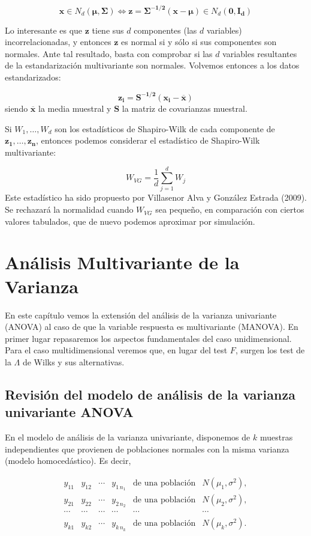 \documentclass[
  a4paper,
  oneside]{scrbook}
\theoremstyle{definition}
\theoremstyle{definition}
\theoremstyle{definition}
\theoremstyle{definition}
\theoremstyle{remark}
\begin{document}
\[\bm{x}\in N_d(\bm{\mu},\bm{\Sigma}) \Longleftrightarrow \bm{z}=\bm{\Sigma^{-1/2}}(\bm{x}-\bm{\mu})\in N_d(\bm{0},\bm{I_d})\]

Lo interesante es que \(\bm{z}\) tiene sus \(d\) componentes (las \(d\)
variables) incorrelacionadas, y entonces \(\bm{z}\) es normal si y sólo si
sus componentes son normales. Ante tal resultado, basta con comprobar si
las \(d\) variables resultantes de la estandarización multivariante son
normales. Volvemos entonces a los datos estandarizados:

\[\bm{z_i}=\bm{S^{-1/2}}\left(\bm{x_i}-\overline{\bm{x}}\right)\] siendo
\(\overline{\bm{x}}\) la media muestral y \(\bm{S}\) la matriz de covarianzas
muestral.

Si \(W_1,\ldots,W_d\) son los estadísticos de Shapiro-Wilk de cada
componente de \(\bm{z_1},\ldots,\bm{z_n}\), entonces podemos considerar el
estadístico de Shapiro-Wilk multivariante:

\[W_{VG}=\frac{1}{d}\sum_{j=1}^d W_j\] Este estadístico ha sido
propuesto por Villasenor Alva y González Estrada (2009). Se rechazará la
normalidad cuando \(W_{VG}\) sea pequeño, en comparación con ciertos
valores tabulados, que de nuevo podemos aproximar por simulación.

\chapter{Análisis Multivariante de la Varianza}\label{analisis-multivariante-de-la-varianza}

En este capítulo vemos la extensión del análisis de la varianza univariante
(ANOVA) al caso de que la variable respuesta es multivariante (MANOVA).
En primer lugar repasaremos los aspectos fundamentales del caso
unidimensional. Para el caso multidimensional veremos que, en lugar del
test \(F\), surgen los test de la \(\Lambda\) de Wilks y sus alternativas.

\section{Revisión del modelo de análisis de la varianza univariante ANOVA}\label{revision-del-modelo-de-analisis-de-la-varianza-univariante-anova}

En el modelo de análisis de la varianza univariante, disponemos de \(k\)
muestras independientes que provienen de poblaciones normales con la
misma varianza (modelo homocedástico). Es decir,

\[\begin{array}{cccccc}
y_{11} & y_{12} & \cdots & y_{1\,n_1} & \mbox{de una población} & N\left(\mu_1,\sigma^2\right), \\
y_{21} & y_{22} & \cdots & y_{2\,n_2} & \mbox{de una población} & N\left(\mu_2,\sigma^2\right), \\
\cdots & \cdots & \cdots & \cdots & \cdots & \cdots \\
y_{k1} & y_{k2} & \cdots & y_{k\,n_k} &\mbox{de una población} & N\left(\mu_k,\sigma^2\right).
\end{array}\]
\end{document}
